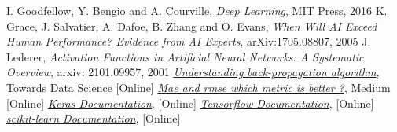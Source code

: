 	
\begin{thebibliography}{9}
 I. Goodfellow, Y. Bengio and A. Courville, \href{http://www.deeplearningbook.org}{\emph{Deep Learning}}, MIT Press, 2016
K. Grace, J. Salvatier, A. Dafoe, B. Zhang and O. Evans, \emph{When Will AI Exceed Human Performance? Evidence from AI Experts}, arXiv:1705.08807, 2005
 J. Lederer, \emph{Activation Functions in Artificial Neural Networks: A Systematic Overview}, arxiv: 2101.09957, 2001
\href{https://towardsdatascience.com/understanding-backpropagation-algorithm-7bb3aa2f95fd}{\emph{Understanding back-propagation algorithm}}, Towards Data Science [Online]
\href{https://medium.com/human-in-a-machine-world/mae-and-rmse-which-metric-is-better-e60ac3bde13d}{\emph{Mae and rmse which metric is better ?}}, Medium [Online]
\href{https://keras.io/}{\emph{Keras Documentation}}, [Online]  
\href{https://www.tensorflow.org/}{\emph{Tensorflow Documentation}}, [Online] 
\href{https://scikit-learn.org/stable/}{\emph{scikit-learn Documentation}}, [Online]
\end{thebibliography}